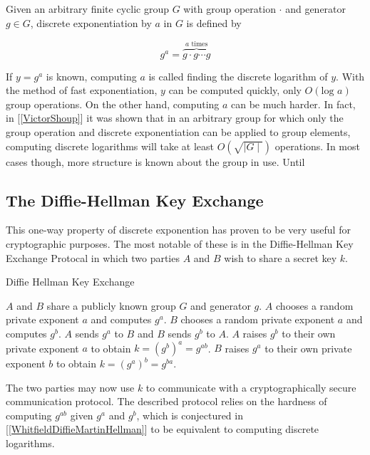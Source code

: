 
Given an arbitrary finite cyclic group $G$ with group operation $\cdot$ and generator $g \in G$, discrete exponentiation by $a$ in $G$ is defined by 

$$
g^a = \overbrace{g \cdot g \cdots g}^{a \text{ times}}
$$

If $y = g^a$ is known, computing $a$ is called finding the discrete logarithm of $y$. With the method of fast exponentiation, $y$ can be computed quickly, only $O(\text{log } a)$ group operations. On the other hand, computing $a$ can be much harder. In fact, in [\ref{VictorShoup}] it was shown that in an arbitrary group for which only the group operation and discrete exponentiation can be applied to group elements, computing discrete logarithms will take at least $O(\sqrt{\mid G \mid})$ operations. In most cases though, more structure is known about the group in use. Until 

\subsection{The Diffie-Hellman Key Exchange}

This one-way property of discrete exponention has proven to be very useful for cryptographic purposes. The most notable of these is in the Diffie-Hellman Key Exchange Protocal in which two parties $A$ and $B$ wish to share a secret key $k$.

\begin{algorithm} 
	\caption{Diffie Hellman Key Exchange}
	\begin{algorithmic}[1]
		\State $A$ and $B$ share a publicly known group $G$ and generator $g$.
		\State $A$ chooses a random private exponent $a$ and computes $g^a$.
		\State $B$ chooses a random private exponent $a$ and computes $g^b$.
		\State $A$ sends $g^a$ to $B$ and $B$ sends $g^b$ to $A$. 
		\State $A$ raises $g^b$ to their own private exponent $a$ to obtain $k = (g^b)^a = g^{ab}$.
		\State $B$ raises $g^a$ to their own private exponent $b$ to obtain $k = (g^a)^b = g^{ba}$.
	\end{algorithmic} 
\end{algorithm}  


The two parties may now use $k$ to communicate with a cryptographically secure communication protocol. The described protocol relies on the hardness of computing $g^{ab}$ given $g^a$ and $g^b$, which is conjectured in [\ref{WhitfieldDiffieMartinHellman}] to be equivalent to computing discrete logarithms.


